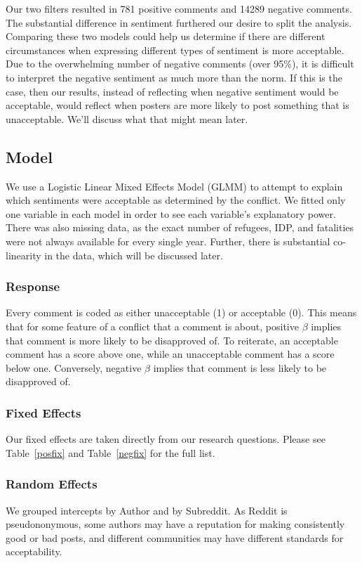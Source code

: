 Our two filters resulted in 781 positive comments and 14289 negative comments. The substantial difference in sentiment furthered our desire to split the analysis. Comparing these two models could help us determine if there are different circumstances when expressing different types of sentiment is more acceptable. Due to the overwhelming number of negative comments (over 95\%), it is difficult to interpret the negative sentiment as much more than the norm. If this is the case, then our results, instead of reflecting when negative sentiment would be acceptable, would reflect when posters are more likely to post something that is unacceptable. We'll discuss what that might mean later.

\subsection{Model}
We use a Logistic Linear Mixed Effects Model (GLMM) to attempt to explain which sentiments were acceptable as determined by the conflict. We fitted only one variable in each model in order to see each variable's explanatory power. There was also missing data, as the exact number of refugees, IDP, and fatalities were not always available for every single year. Further, there is substantial co-linearity in the data, which will be discussed later.

\subsubsection{Response}
Every comment is coded as either unacceptable (1) or acceptable (0). This means that for some feature of a conflict that a comment is about, positive $\beta$ implies that comment is more likely to be disapproved of. To reiterate, an acceptable comment has a score above one, while an unacceptable comment has a score below one. Conversely, negative $\beta$ implies that comment is less likely to be disapproved of. 

\subsubsection{Fixed Effects}
Our fixed effects are taken directly from our research questions. Please see Table~\ref{posfix} and Table~\ref{negfix} for the full list.

\subsubsection{Random Effects}
We grouped intercepts by Author and by Subreddit. As Reddit is pseudononymous, some authors may have a reputation for making consistently good or bad posts, and different communities may have different standards for acceptability.